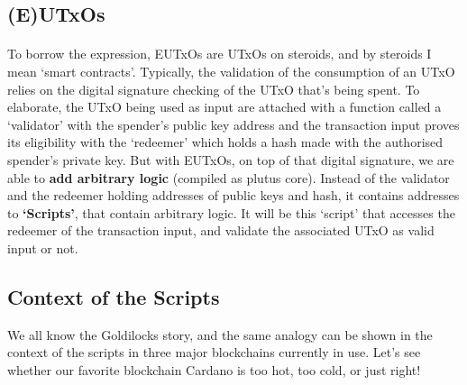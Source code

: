 \documentclass[a4paper, 11pt]{article}
\begin{document}
    \subsection{(E)UTxOs}

    \paragraph{} To borrow the expression, EUTxOs are UTxOs on steroids, and by steroids I mean `smart contracts'. Typically, the validation of the consumption of an UTxO relies on the digital signature checking of the UTxO that's being spent. To elaborate, the UTxO being used as input are attached with a function called a `validator' with the spender's public key address and the transaction input proves its eligibility with the `redeemer' which holds a hash made with the authorised spender's private key.  But with EUTxOs, on top of that digital signature, we are able to \textbf{add arbitrary logic} (compiled as plutus core). Instead of the validator and the redeemer holding addresses of public keys and hash, it contains addresses to \textbf{`Scripts'}, that contain arbitrary logic. It will be this  `script' that accesses the redeemer of the transaction input, and validate the associated UTxO as valid input or not. 

    \subsection{Context of the Scripts}
    We all know the Goldilocks story, and the same analogy can be shown in the context of the scripts in three major blockchains currently in use. Let's see whether our favorite blockchain Cardano is too hot, too cold, or just right!
\end{document}
